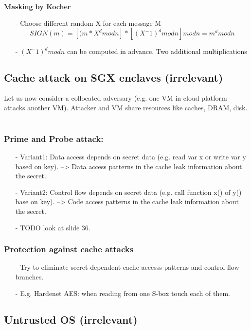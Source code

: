 \textbf{Masking by Kocher}
\begin{itemize}
    \item [-]Choose different random X for each message M
    $$SIGN(m) = [(m*X^d mod n] * [(X^-1 )^d mod n] mod n = m^d mod n$$
    \item[-] $(X^-1)^d mod n$ can be computed in advance. Two additional multiplications
\end{itemize}{}

\subsection{Cache attack on SGX enclaves (irrelevant)}
Let us now consider a collocated adversary (e.g. one VM in cloud platform attacks another VM). Attacker and VM share resources like caches, DRAM, disk.\\
\\
\subsubsection{Prime and Probe attack:}
\begin{itemize}
    \item[-] Variant1: Data access depends on secret data (e.g. read var x or write var y based on key). --> Data access patterns in the cache leak information about the secret. 
    \item[-] Variant2: Control flow depends on secret data (e.g. call function x() of y() base on key). --> Code access patterns in the cache leak information about the secret.
    \item[-] TODO look at slide 36.
\end{itemize}

\subsubsection{Protection against cache attacks}
\begin{itemize}
    \item[-]Try to eliminate secret-dependent cache accesss patterns and control flow branches.
    \item[-]E.g. Hardenet AES: when reading from one S-box touch each of them.
\end{itemize}

\subsection{Untrusted OS (irrelevant)}


